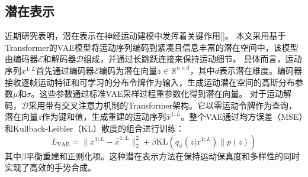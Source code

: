 \subsection{潜在表示}
近期研究表明，潜在表示在神经运动建模中发挥着关键作用[]。
本文采用基于Transformer的VAE模型将运动序列编码到紧凑且信息丰富的潜在空间中，该模型由编码器$\mathcal{E}$和解码器$\mathcal{D}$组成，并通过长跳跃连接来保持运动细节。
具体而言，运动序列$x^{1:L}$首先通过编码器$\mathcal{E}$编码为潜在向量$z \in \mathbb{R}^{n\times d}$，其中$d$表示潜在维度。编码器接收逐帧运动特征和可学习的分布令牌作为输入，生成运动潜在空间的高斯分布参数$\mu$和$\sigma$。这些参数通过标准VAE采样过程重参数化得到潜在向量。
对于运动解码，$\mathcal{D}$采用带有交叉注意力机制的Transformer架构。它以零运动令牌作为查询，潜在向量$z$作为键和值，生成重建的运动序列$\hat{x}^{1:L}$。整个VAE通过均方误差（MSE）和Kullback-Leibler（KL）散度的组合进行训练：
\begin{equation}
L_{\text{VAE}} = \|x^{1:L} - \hat{x}^{1:L}\|_2^2 + \beta \text{KL}(q_{\phi}(z|x^{1:L})\|p(z))
\label{eq:loss_vae}
\end{equation}
其中$\beta$平衡重建和正则化项。这种潜在表示方法在保持运动保真度和多样性的同时实现了高效的手势合成。

